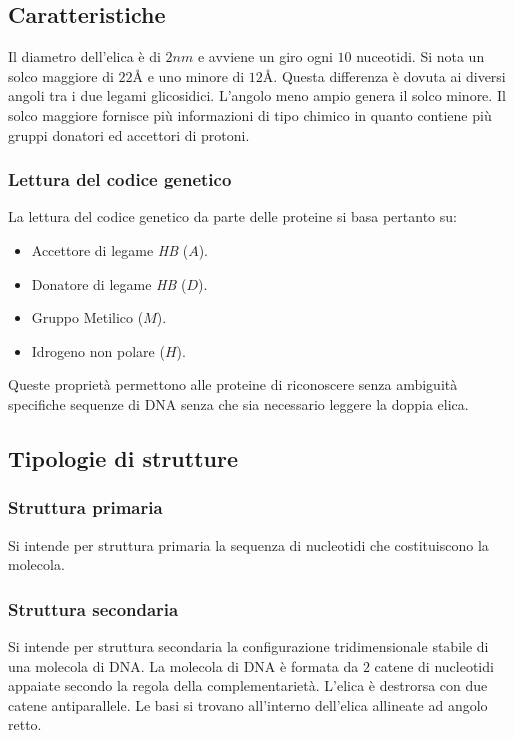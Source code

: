 	\subsection{Caratteristiche}
	Il diametro dell'elica \`e di $2\si{nm}$ e avviene un giro ogni $10$ nuceotidi.
	Si nota un solco maggiore di $22\si{\angstrom}$ e uno minore di $12\si{\angstrom}$.
	Questa differenza \`e dovuta ai diversi angoli tra i due legami glicosidici.
	L'angolo meno ampio genera il solco minore.
	Il solco maggiore fornisce pi\`u informazioni di tipo chimico in quanto contiene pi\`u gruppi donatori ed accettori di protoni.

		\subsubsection{Lettura del codice genetico}
		La lettura del codice genetico da parte delle proteine si basa pertanto su:
		\begin{multicols}{2}
			\begin{itemize}
				\item Accettore di legame \emph{HB} ($A$).
				\item Donatore di legame \emph{HB} ($D$).
				\item Gruppo Metilico ($M$).
				\item Idrogeno non polare ($H$).
			\end{itemize}
		\end{multicols}
		Queste propriet\`a permettono alle proteine di riconoscere senza ambiguit\`a specifiche sequenze di DNA senza che sia necessario leggere la doppia elica.
	\subsection{Tipologie di strutture}

		\subsubsection{Struttura primaria}
		Si intende per struttura primaria la sequenza di nucleotidi che costituiscono la molecola.

		\subsubsection{Struttura secondaria}
		Si intende per struttura secondaria la configurazione tridimensionale stabile di una molecola di DNA.
		La molecola di DNA \`e formata da $2$ catene di nucleotidi appaiate secondo la regola della complementariet\`a.
		L'elica \`e destrorsa con due catene antiparallele.
		Le basi si trovano all'interno dell'elica allineate ad angolo retto.

